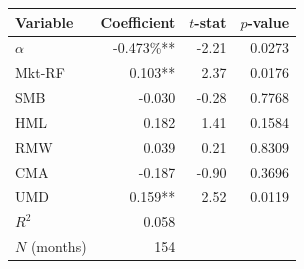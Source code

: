 \begin{tabular}{lrrr}
\toprule
Variable & Coefficient & $t$-stat & $p$-value \\
\midrule
$\alpha$ & -0.473\%** & -2.21 & 0.0273 \\
Mkt-RF & 0.103** & 2.37 & 0.0176 \\
SMB & -0.030 & -0.28 & 0.7768 \\
HML & 0.182 & 1.41 & 0.1584 \\
RMW & 0.039 & 0.21 & 0.8309 \\
CMA & -0.187 & -0.90 & 0.3696 \\
UMD & 0.159** & 2.52 & 0.0119 \\
\midrule
$R^2$ & 0.058 & & \\
$N$ (months) & 154 & & \\
\bottomrule
\end{tabular}